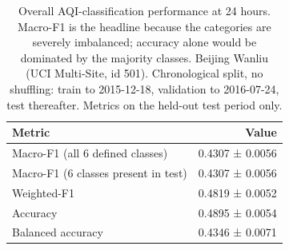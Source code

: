 \begin{table}[htbp]
\caption{Overall AQI-classification performance at 24 hours. Macro-F1 is the headline because the categories are severely imbalanced; accuracy alone would be dominated by the majority classes. Beijing Wanliu (UCI Multi-Site, id 501). Chronological split, no shuffling: train to 2015-12-18, validation to 2016-07-24, test thereafter. Metrics on the held-out test period only.}
\label{tab:classification_overall}
\begin{tabular}{lr}
\toprule
Metric & Value \\
\midrule
Macro-F1 (all 6 defined classes) & 0.4307 ± 0.0056 \\
Macro-F1 (6 classes present in test) & 0.4307 ± 0.0056 \\
Weighted-F1 & 0.4819 ± 0.0052 \\
Accuracy & 0.4895 ± 0.0054 \\
Balanced accuracy & 0.4346 ± 0.0071 \\
\bottomrule
\end{tabular}
\end{table}
